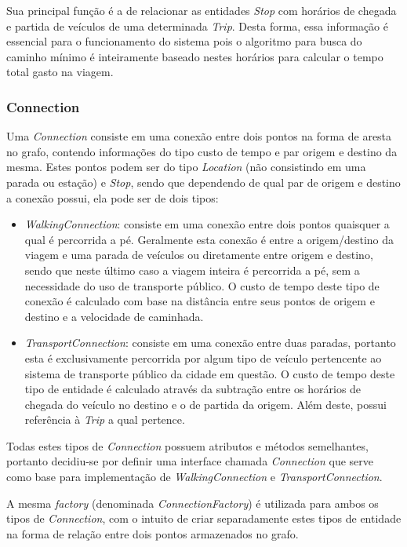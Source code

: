 Sua principal função é a de relacionar as entidades \emph{Stop} com horários de chegada e partida de veículos de uma determinada \emph{Trip}.
Desta forma, essa informação é essencial para o funcionamento do sistema pois o algoritmo para busca do caminho mínimo é inteiramente baseado nestes horários para calcular o tempo total gasto na viagem.

\subsubsection{Connection}
\label{conn}
Uma \emph{Connection} consiste em uma conexão entre dois pontos na forma de aresta no grafo, contendo informações do tipo custo de tempo e par origem e destino da mesma.
Estes pontos podem ser do tipo \emph{Location} (não consistindo em uma parada ou estação) e \emph{Stop}, sendo que dependendo de qual par de origem e destino a conexão possui, ela pode ser de dois tipos:

\begin{itemize}
	\item \emph{WalkingConnection}: consiste em uma conexão entre dois pontos quaisquer a qual é percorrida a pé. 
	Geralmente esta conexão é entre a origem/destino da viagem e uma parada de veículos ou diretamente entre origem e destino, sendo que neste último caso a viagem 		inteira é percorrida a pé, sem a necessidade do uso de transporte público.
	O custo de tempo deste tipo de conexão é calculado com base na distância entre seus pontos de origem e destino e a velocidade de caminhada.
	\item \emph{TransportConnection}: consiste em uma conexão entre duas paradas, portanto esta é exclusivamente percorrida por algum tipo de veículo pertencente ao 	sistema de transporte público da cidade em questão.
	O custo de tempo deste tipo de entidade é calculado através da subtração entre os horários de chegada do veículo no destino e o de partida da origem.
	Além deste, possui referência à \emph{Trip} a qual pertence.
\end{itemize}

Todas estes tipos de \emph{Connection} possuem atributos e métodos semelhantes, portanto decidiu-se por definir uma interface chamada \emph{Connection} que serve como base para implementação de \emph{WalkingConnection} e \emph{TransportConnection}.

A mesma \emph{factory} (denominada \emph{ConnectionFactory}) é utilizada para ambos os tipos de \emph{Connection}, com o intuito de criar separadamente estes tipos de entidade na forma de relação entre dois pontos armazenados no grafo.

